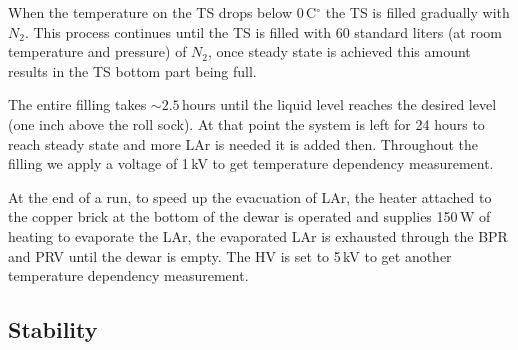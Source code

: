 \documentclass[a4paper,12pt]{article}
\begin{document}
When the temperature on the TS drops below 0\,C$^\circ$ the TS is filled gradually with $N_2$. This process continues until the TS is filled with 60 standard liters (at room temperature and pressure) of $N_2$, once steady state is achieved this amount results in the TS bottom part being full. 

The entire filling takes $\sim2.5$\,hours until the liquid level reaches the desired level (one inch above the roll sock). At that point the system is left for 24 hours to reach steady state and more LAr is needed it is added then. Throughout the filling we apply a voltage of 1\,kV to get temperature dependency measurement.

At the end of a run, to speed up the evacuation of LAr, the heater attached to the copper brick at the bottom of the dewar is operated and supplies 150\,W of heating to evaporate the LAr, the evaporated LAr is exhausted through the BPR and PRV until the dewar is empty. The HV is set to 5\,kV to get another temperature dependency measurement. 



\subsection{Stability}
\label{sec:stab}

\end{document}
